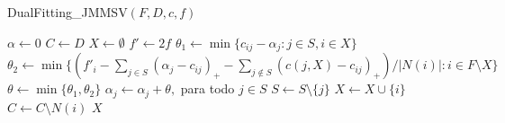 \begin{algorithm}
    \caption{DualFitting\_JMMSV$(F,D,c,f)$}
    \begin{algorithmic}[1]
    \State $\alpha \gets 0$
    \State $C \gets D$
    \State $X \gets \emptyset$
    \State $f' \gets 2f$
    \State $\theta_1 \gets \min\{c_{ij} - \alpha_j:j \in S,i\in X\}$
    \State $\theta_2 \gets \min\{(f'_i - \sum_{j \in S}(\alpha_j - c_{ij})_+ - \sum_{j \not \in S}(c(j,X) - c_{ij})_+)/|N(i)|: i \in F \setminus X\}$
    \State $\theta \gets \min\{\theta_1,\theta_2\}$
    \State $\alpha_j \gets \alpha_j + \theta,$ para todo $j \in S$
    \State $S \gets S \setminus \{j\}$
    \EndIf
    \State $X \gets X \cup \{i\}$
    \State $C \gets C\setminus N(i)$
    \EndIf
    \EndWhile
    \State \Return $X$
    \end{algorithmic}
\end{algorithm}